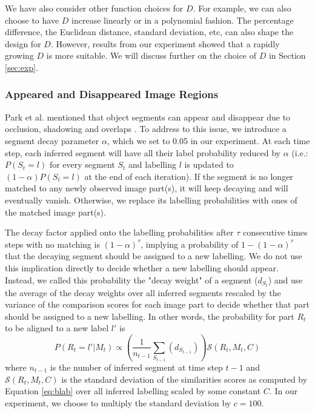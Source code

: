 \documentclass{article}
\begin{document}
We have also consider other function choices for $D$. For example, we can also choose to have $D$ increase linearly or in a polynomial fashion. The percentage difference, the Euclidean distance, standard deviation, etc, can also shape the design for $D$. However, results from our experiment showed that a rapidly growing $D$ is more suitable. We will discuss further on the choice of $D$ in Section \ref{sec:exp}.

\subsubsection{Appeared and Disappeared Image Regions}

Park et al. mentioned that object segments can appear and disappear due to occlusion, shadowing and overlaps \cite{human-action}. To address to this issue, we introduce a segment decay parameter $\alpha$, which we set to 0.05 in our experiment. At each time step, each inferred segment will have all their label probability reduced by $\alpha$ (i.e.: $P(S_{t} = l)$ for every segment $S_t$ and labelling $l$ is updated to $(1-\alpha)P(S_{t} = l)$ at the end of each iteration). If the segment is no longer matched to any newly observed image part(s), it will keep decaying and will eventually vanish. Otherwise, we replace its labelling probabilities with ones of the matched image part(s). 

The decay factor applied onto the labelling probabilities after $\tau$ consecutive times steps with no matching is $(1-\alpha)^{\tau}$, implying a probability of $1- (1-\alpha)^{\tau}$ that the decaying segment should be assigned to a new labelling. We do not use this implication directly to decide whether a new labelling should appear. Instead, we called this probability the "decay weight" of a segment ($d_{S_t}$) and use the average of the decay weights over all inferred segments rescaled by the variance of the comparison scores for each image part to decide whether that part should be assigned to a new labelling. In other words, the probability for part $R_t$ to be aligned to a new label $l'$ is
\begin{equation}
	P(R_t = l' | M_t) \propto \left(\frac{1}{n_{t-1}} \sum_{S_{t-1}}(d_{S_{t-1}})\right)\mathcal{S}(R_t, M_t, C)
\end{equation}
where $n_{t-1}$ is the number of inferred segment at time step $t-1$ and $\mathcal{S}(R_t, M_t, C)$ is the standard deviation of the similarities scores as computed by Equation \ref{eq:blab} over all inferred labelling scaled by some constant $C$. In our experiment, we choose to multiply the standard deviation by $c = 100$. 
\end{document}
